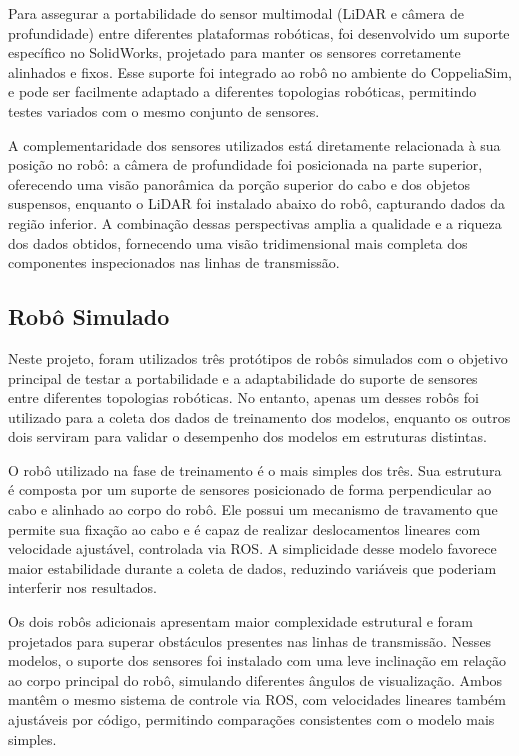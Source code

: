 Para assegurar a portabilidade do sensor multimodal (LiDAR e câmera de profundidade) entre diferentes plataformas robóticas, foi desenvolvido um suporte específico no SolidWorks, projetado para manter os sensores corretamente alinhados e fixos. Esse suporte foi integrado ao robô no ambiente do CoppeliaSim, e pode ser facilmente adaptado a diferentes topologias robóticas, permitindo testes variados com o mesmo conjunto de sensores.

A complementaridade dos sensores utilizados está diretamente relacionada à sua posição no robô: a câmera de profundidade foi posicionada na parte superior, oferecendo uma visão panorâmica da porção superior do cabo e dos objetos suspensos, enquanto o LiDAR foi instalado abaixo do robô, capturando dados da região inferior. A combinação dessas perspectivas amplia a qualidade e a riqueza dos dados obtidos, fornecendo uma visão tridimensional mais completa dos componentes inspecionados nas linhas de transmissão.

\subsection{Robô Simulado}

Neste projeto, foram utilizados três protótipos de robôs simulados com o objetivo principal de testar a portabilidade e a adaptabilidade do suporte de sensores entre diferentes topologias robóticas. No entanto, apenas um desses robôs foi utilizado para a coleta dos dados de treinamento dos modelos, enquanto os outros dois serviram para validar o desempenho dos modelos em estruturas distintas.

O robô utilizado na fase de treinamento é o mais simples dos três. Sua estrutura é composta por um suporte de sensores posicionado de forma perpendicular ao cabo e alinhado ao corpo do robô. Ele possui um mecanismo de travamento que permite sua fixação ao cabo e é capaz de realizar deslocamentos lineares com velocidade ajustável, controlada via ROS. A simplicidade desse modelo favorece maior estabilidade durante a coleta de dados, reduzindo variáveis que poderiam interferir nos resultados.

Os dois robôs adicionais apresentam maior complexidade estrutural e foram projetados para superar obstáculos presentes nas linhas de transmissão. Nesses modelos, o suporte dos sensores foi instalado com uma leve inclinação em relação ao corpo principal do robô, simulando diferentes ângulos de visualização. Ambos mantêm o mesmo sistema de controle via ROS, com velocidades lineares também ajustáveis por código, permitindo comparações consistentes com o modelo mais simples.


